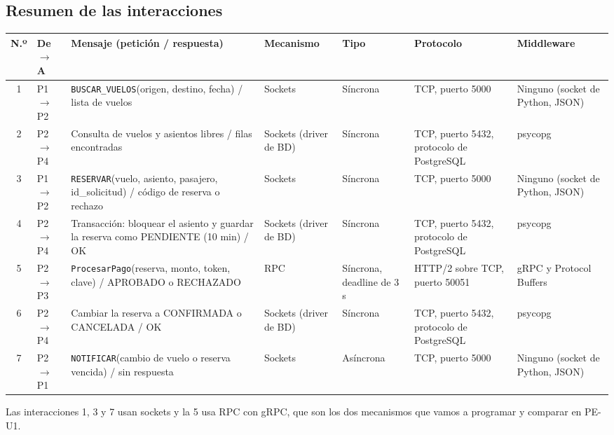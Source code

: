 \subsection{Resumen de las interacciones}

\begin{center}
\footnotesize
\setlength{\tabcolsep}{4pt}
\renewcommand{\arraystretch}{1.3}
\begin{tabularx}{\textwidth}{@{}c l >{\raggedright\arraybackslash}X >{\raggedright\arraybackslash}p{1.9cm} >{\raggedright\arraybackslash}p{1.6cm} >{\raggedright\arraybackslash}p{2.5cm} >{\raggedright\arraybackslash}p{2.2cm}@{}}
\toprule
\textbf{N.º} & \textbf{De $\to$ A} & \textbf{Mensaje (petición / respuesta)} & \textbf{Mecanismo} & \textbf{Tipo} & \textbf{Protocolo} & \textbf{Middleware} \\
\midrule
1 & P1 $\to$ P2 & \texttt{BUSCAR\_VUELOS}(origen, destino, fecha) / lista de vuelos & Sockets & Síncrona & TCP, puerto 5000 & Ninguno (socket de Python, JSON) \\
2 & P2 $\to$ P4 & Consulta de vuelos y asientos libres / filas encontradas & Sockets (driver de BD) & Síncrona & TCP, puerto 5432, protocolo de PostgreSQL & psycopg \\
3 & P1 $\to$ P2 & \texttt{RESERVAR}(vuelo, asiento, pasajero, id\_solicitud) / código de reserva o rechazo & Sockets & Síncrona & TCP, puerto 5000 & Ninguno (socket de Python, JSON) \\
4 & P2 $\to$ P4 & Transacción: bloquear el asiento y guardar la reserva como PENDIENTE (10 min) / OK & Sockets (driver de BD) & Síncrona & TCP, puerto 5432, protocolo de PostgreSQL & psycopg \\
5 & P2 $\to$ P3 & \texttt{ProcesarPago}(reserva, monto, token, clave) / APROBADO o RECHAZADO & RPC & Síncrona, deadline de 3 s & HTTP/2 sobre TCP, puerto 50051 & gRPC y Protocol Buffers \\
6 & P2 $\to$ P4 & Cambiar la reserva a CONFIRMADA o CANCELADA / OK & Sockets (driver de BD) & Síncrona & TCP, puerto 5432, protocolo de PostgreSQL & psycopg \\
7 & P2 $\to$ P1 & \texttt{NOTIFICAR}(cambio de vuelo o reserva vencida) / sin respuesta & Sockets & Asíncrona & TCP, puerto 5000 & Ninguno (socket de Python, JSON) \\
\bottomrule
\end{tabularx}
\end{center}

Las interacciones 1, 3 y 7 usan sockets y la 5 usa RPC con gRPC, que son los dos mecanismos que vamos a programar y comparar en PE-U1.

